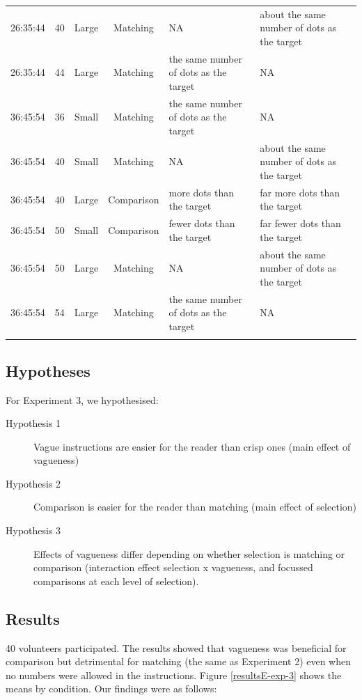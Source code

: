 \begin{table}
{\begin{tabular}{ccccll}
26:35:44 &  40 & Large & Matching 	& NA & about the same number of dots as the target \\ 
26:35:44 &  44 & Large & Matching 	& the same number of dots as the target & NA \\ 
\noalign{\smallskip}\hline\noalign{\smallskip}
36:45:54 &  36 & Small & Matching 	& the same number of dots as the target & NA \\ 
36:45:54 &  40 & Small & Matching 	& NA & about the same number of dots as the target \\ 
36:45:54 &  40 & Large & Comparison & more dots than the target & far more dots than the target \\ 
36:45:54 &  50 & Small & Comparison & fewer dots than the target & far fewer dots than the target \\ 
36:45:54 &  50 & Large & Matching 	& NA & about the same number of dots as the target \\ 
36:45:54 &  54 & Large & Matching 	& the same number of dots as the target & NA \\ 
\noalign{\smallskip}\hline
\end{tabular}}
\end{table}

\subsection{Hypotheses}

For Experiment 3, we hypothesised:

\begin{description}
	\item [Hypothesis 1] Vague instructions are easier for the reader than crisp ones (main effect of vagueness)
	\item [Hypothesis 2] Comparison is easier for the reader than matching (main effect of selection)
	\item [Hypothesis 3] Effects of vagueness differ depending on whether selection is matching or comparison (interaction effect selection x vagueness, and focussed comparisons at each level of selection).
\end{description}

\subsection{Results}
40 volunteers participated. The results showed that vagueness was beneficial for comparison but detrimental for matching (the same as Experiment 2) even when no numbers were allowed in the instructions. Figure \ref{resultsE-exp-3} shows the means by condition. Our findings were as follows:

